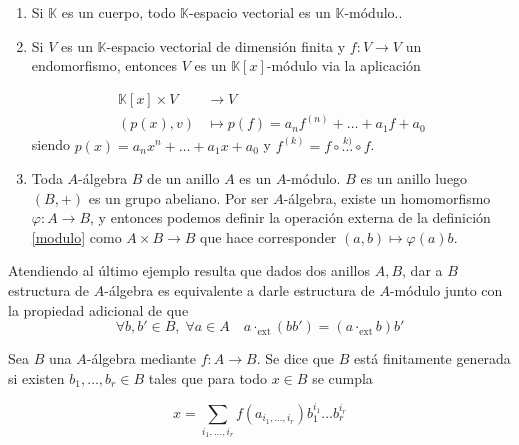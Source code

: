 \documentclass[./main.tex]{subfiles}
\begin{document}
\begin{example}
\begin{enumerate}
  \item Si $\mathbb K $ es un cuerpo, todo $\mathbb K$-espacio vectorial es un $\mathbb K$-módulo..
  \item Si $V$ es un $\mathbb K$-espacio vectorial de dimensión finita y $f:V\to V$ un endomorfismo, entonces $V$ es un $\mathbb K[x]$-módulo via la aplicación

  \begin{align*}
    {\mathbb K[x]\times V} & \to     V                                 \\
    {(p(x),v)}             & \mapsto p(f) = a_nf^{(n)}+\dots+a_1 f+a_0
  \end{align*}
  siendo $p(x) = a_nx^n+\dots+a_1x + a_0$ y $f^(k) = f\circ \overset{k)}{\dots} \circ f$.
  \item Toda $A$-álgebra $B$ de un anillo $A$ es un $A$-módulo. $B$ es un anillo luego $(B,+)$ es un grupo abeliano. Por ser $A$-álgebra, existe un homomorfismo $\varphi:A\to B$, y entonces podemos definir la operación externa de la definición \ref{modulo} como $A\times B \to B$ que hace corresponder $(a,b) \mapsto\varphi(a)b$.
\end{enumerate}
\end{example}

\begin{remark} \label{prop_adicional}
Atendiendo al último ejemplo resulta que dados dos anillos $A, B$, dar a $B$ estructura de $A$-álgebra es equivalente a darle estructura de $A$-módulo junto con la propiedad adicional de que
\[\forall b, b' \in B, \; \forall a \in  A \quad a \cdot_{\text{ext}} (bb') = (a\cdot_{\text{ext}} b) b'\]
\end{remark}

\begin{definition}
  Sea $B$ una $A$-álgebra mediante $f:A\to B$. Se dice que $B$ está finitamente generada si existen $b_1, \dots, b_r \in B$ tales que para todo $x \in B$ se cumpla

  \[x = \sum _{i_1, \dots, i_r} f(a_{i_1,\dots,i_r}) b_1^{i_1}\dots b_r^{i_r}\]
\end{definition}
\end{document}
